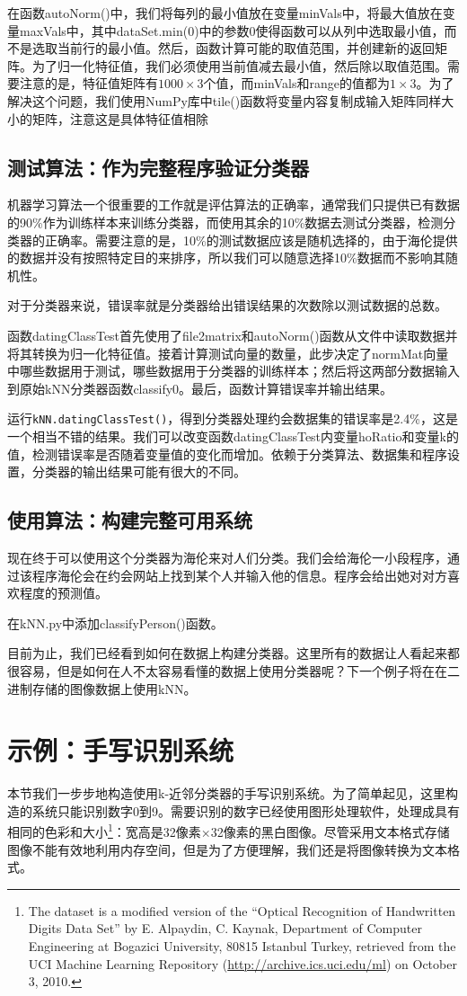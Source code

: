 在函数autoNorm()中，我们将每列的最小值放在变量minVals中，将最大值放在变量maxVals中，其中dataSet.min(0)中的参数0使得函数可以从列中选取最小值，而不是选取当前行的最小值。然后，函数计算可能的取值范围，并创建新的返回矩阵。为了归一化特征值，我们必须使用当前值减去最小值，然后除以取值范围。需要注意的是，特征值矩阵有$1000\times3$个值，而minVals和range的值都为$1\times3$。为了解决这个问题，我们使用NumPy库中tile()函数将变量内容复制成输入矩阵同样大小的矩阵，注意这是具体特征值相除

\subsection{测试算法：作为完整程序验证分类器}
机器学习算法一个很重要的工作就是评估算法的正确率，通常我们只提供已有数据的90\%作为训练样本来训练分类器，而使用其余的10\%数据去测试分类器，检测分类器的正确率。需要注意的是，10\%的测试数据应该是随机选择的，由于海伦提供的数据并没有按照特定目的来排序，所以我们可以随意选择10\%数据而不影响其随机性。

对于分类器来说，错误率就是分类器给出错误结果的次数除以测试数据的总数。

函数datingClassTest首先使用了file2matrix和autoNorm()函数从文件中读取数据并将其转换为归一化特征值。接着计算测试向量的数量，此步决定了normMat向量中哪些数据用于测试，哪些数据用于分类器的训练样本；然后将这两部分数据输入到原始kNN分类器函数classify0。最后，函数计算错误率并输出结果。

运行\verb|kNN.datingClassTest()|，得到分类器处理约会数据集的错误率是2.4\%，这是一个相当不错的结果。我们可以改变函数datingClassTest内变量hoRatio和变量k的值，检测错误率是否随着变量值的变化而增加。依赖于分类算法、数据集和程序设置，分类器的输出结果可能有很大的不同。
\subsection{使用算法：构建完整可用系统}
现在终于可以使用这个分类器为海伦来对人们分类。我们会给海伦一小段程序，通过该程序海伦会在约会网站上找到某个人并输入他的信息。程序会给出她对对方喜欢程度的预测值。

在kNN.py中添加classifyPerson()函数。

目前为止，我们已经看到如何在数据上构建分类器。这里所有的数据让人看起来都很容易，但是如何在人不太容易看懂的数据上使用分类器呢？下一个例子将在在二进制存储的图像数据上使用kNN。

\section{示例：手写识别系统}
本节我们一步步地构造使用k-近邻分类器的手写识别系统。为了简单起见，这里构造的系统只能识别数字0到9。需要识别的数字已经使用图形处理软件，处理成具有相同的色彩和大小\footnote{The dataset is a modified version of the “Optical Recognition of Handwritten Digits Data Set” by E. Alpaydin, C. Kaynak, Department of Computer Engineering at Bogazici University, 80815 Istanbul Turkey, retrieved from the UCI Machine Learning Repository (\url{http://archive.ics.uci.edu/ml}) on October 3, 2010.}：宽高是32像素$\times$32像素的黑白图像。尽管采用文本格式存储图像不能有效地利用内存空间，但是为了方便理解，我们还是将图像转换为文本格式。

